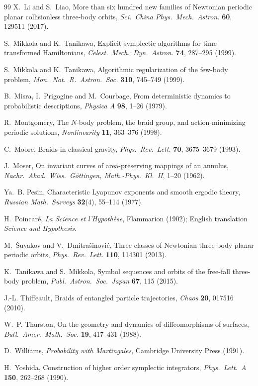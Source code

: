 \documentclass[11pt]{article}
\theoremstyle{remark}
\begin{document}
\begin{thebibliography}{99}
 X.~Li and S.~Liao, More than six hundred new families of Newtonian periodic planar
collisionless three-body orbits, \emph{Sci.\ China Phys.\ Mech.\ Astron.} \textbf{60}, 129511 (2017).

 S.~Mikkola and K.~Tanikawa, Explicit symplectic algorithms for time-transformed
Hamiltonians, \emph{Celest.\ Mech.\ Dyn.\ Astron.} \textbf{74}, 287--295 (1999).

 S.~Mikkola and K.~Tanikawa, Algorithmic regularization of the few-body problem,
\emph{Mon.\ Not.\ R.\ Astron.\ Soc.} \textbf{310}, 745--749 (1999).

 B.~Misra, I.~Prigogine and M.~Courbage, From deterministic dynamics to
probabilistic descriptions, \emph{Physica A} \textbf{98}, 1--26 (1979).

 R.~Montgomery, The $N$-body problem, the braid group, and action-minimizing periodic
solutions, \emph{Nonlinearity} \textbf{11}, 363--376 (1998).

 C.~Moore, Braids in classical gravity, \emph{Phys.\ Rev.\ Lett.} \textbf{70}, 3675--3679
(1993).

 J.~Moser, On invariant curves of area-preserving mappings of an annulus, \emph{Nachr.\
Akad.\ Wiss.\ G\"ottingen, Math.-Phys.\ Kl.\ II}, 1--20 (1962).

 Ya.~B. Pesin, Characteristic Lyapunov exponents and smooth ergodic theory, \emph{Russian
Math.\ Surveys} \textbf{32}(4), 55--114 (1977).

 H.~Poincar\'e, \emph{La Science et l'Hypoth\`ese}, Flammarion (1902); English
translation \emph{Science and Hypothesis}.

 M.~\v{S}uvakov and V.~Dmitra\v{s}inovi\'c, Three classes of Newtonian
three-body planar periodic orbits, \emph{Phys.\ Rev.\ Lett.} \textbf{110}, 114301 (2013).

 K.~Tanikawa and S.~Mikkola, Symbol sequences and orbits of the free-fall
three-body problem, \emph{Publ.\ Astron.\ Soc.\ Japan} \textbf{67}, 115 (2015).

 J.-L. Thiffeault, Braids of entangled particle trajectories, \emph{Chaos} \textbf{20},
017516 (2010).

 W.~P. Thurston, On the geometry and dynamics of diffeomorphisms of surfaces,
\emph{Bull.\ Amer.\ Math.\ Soc.} \textbf{19}, 417--431 (1988).

 D.~Williams, \emph{Probability with Martingales}, Cambridge University Press (1991).

 H.~Yoshida, Construction of higher order symplectic integrators, \emph{Phys.\ Lett.\ A}
\textbf{150}, 262--268 (1990).

\end{thebibliography}
\end{document}

